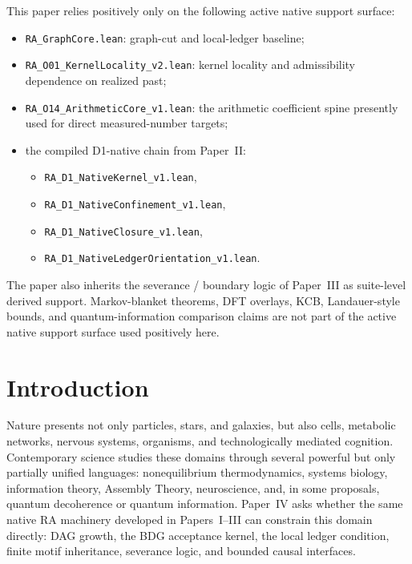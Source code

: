 \documentclass[11pt]{article}
\begin{document}
\begin{tcolorbox}[title=Active Native Support Surface Used Positively,colback=gray!5,colframe=gray!60]
This paper relies positively only on the following active native support surface:
\begin{itemize}[nosep]
    \item \texttt{RA\_GraphCore.lean}: graph-cut and local-ledger baseline;
    \item \texttt{RA\_O01\_KernelLocality\_v2.lean}: kernel locality and admissibility dependence on realized past;
    \item \texttt{RA\_O14\_ArithmeticCore\_v1.lean}: the arithmetic coefficient spine presently used for direct measured-number targets;
    \item the compiled D1-native chain from Paper~II:
    \begin{itemize}[nosep]
        \item \texttt{RA\_D1\_NativeKernel\_v1.lean},
        \item \texttt{RA\_D1\_NativeConfinement\_v1.lean},
        \item \texttt{RA\_D1\_NativeClosure\_v1.lean},
        \item \texttt{RA\_D1\_NativeLedgerOrientation\_v1.lean}.
    \end{itemize}
\end{itemize}
The paper also inherits the severance / boundary logic of Paper~III as suite-level derived support. Markov-blanket theorems, DFT overlays, KCB, Landauer-style bounds, and quantum-information comparison claims are not part of the active native support surface used positively here.
\end{tcolorbox}

\section{Introduction}

Nature presents not only particles, stars, and galaxies, but also cells, metabolic networks, nervous systems, organisms, and technologically mediated cognition. Contemporary science studies these domains through several powerful but only partially unified languages: nonequilibrium thermodynamics, systems biology, information theory, Assembly Theory, neuroscience, and, in some proposals, quantum decoherence or quantum information. Paper~IV asks whether the same native RA machinery developed in Papers~I--III can constrain this domain directly: DAG growth, the BDG acceptance kernel, the local ledger condition, finite motif inheritance, severance logic, and bounded causal interfaces.
\end{document}
